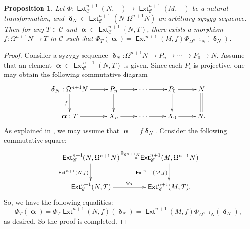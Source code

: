 \documentclass[11pt,a4paper]{amsart}
\newcommand{\rt}{\rightarrow}
\newcommand{\C}{\mathscr{C} }
\def\Ext{\operatorname{{\mathsf{Ext}}}}
\def\syz{\mathsf{\Omega}}
\def\al{\operatorname{\boldsymbol{\alpha}}}
\def\de{\operatorname{\boldsymbol{\delta}}}
\newtheorem{prop}[theorem]{Proposition}
\theoremstyle{definition}
\theoremstyle{plain}
\theoremstyle{definition}
\numberwithin{equation}{section}
\begin{document}
\begin{prop}\label{epi1}Let  $\Phi:\Ext^{n+1}_{\C}(N, -)\rt\Ext^{n+1}_{\C}(M, -)$ be a natural transformation, and  $\de_N\in\Ext^{n+1}_{\C}(N, \syz^{n+1}N)$  an arbitrary syzygy sequence. Then for any $T\in\C$ and  $\al\in\Ext^{n+1}_{\C}(N, T)$, there exists a morphism $f:\syz^{n+1}N\rt T$ in $\C$ such that $\Phi_T(\al)=\Ext^{n+1}(M, f)\Phi_{\syz^{n+1}N}(\de_N)$.
\end{prop}
\begin{proof}
Consider a syzygy sequence $\de_N:\syz^{n+1}N\rt P_n\rt\cdots\rt P_0\rt N$.
Assume that an element $\al\in\Ext^{n+1}_{\C}(N, T)$ is given. Since each $P_i$ is projective, one may obtain the
following commutative diagram
{\footnotesize\[\xymatrix{\de_N:\syz^{n+1}N\ar[d]_{f}\ar[r] & P_{n}\ar[d]\ar[r] & \cdots\ar[r] & P_0\ar[r]\ar[d] & N\ar@{=}[d]\\ \al:T\ar[r] & X_n\ar[r]  & \cdots\ar[r] & X_0\ar[r] & N.}\]}As explained in \cite[Remark 2.7(1)]{bfss}, we may assume that $\al=f\de_N$. Consider the following commutative square:
\[\xymatrix{\Ext^{n+1}_{\C}(N, \syz^{n+1}N)\ar[r]^{\Phi_{\syz^{n+1}N}}\ar[d]_{\Ext^{n+1}(N, f)} & \Ext^{n+1}_{\C}(M, \syz^{n+1}N)\ar[d]_{\Ext^{n+1}(M, f)} \\ \Ext^{n+1}_{\C}(N, T)\ar[r]^{\Phi_T} & \Ext^{n+1}_{\C}(M, T).}\]So, we have the following equalities:  $$\Phi_T(\al)=\Phi_T\Ext^{n+1}(N, f)(\de_N)=\Ext^{n+1}(M, f)\Phi_{\syz^{n+1}N}(\de_N),$$as desired. So the proof is completed.
\end{proof}
\end{document}
